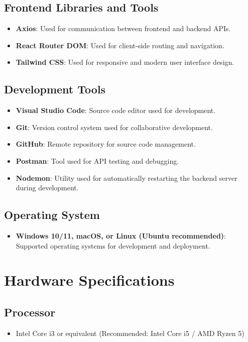 \documentclass[12pt,a4paper]{report}
\begin{document}
\subsection*{Frontend Libraries and Tools}
\begin{itemize}
	\item \textbf{Axios}: Used for communication between frontend and backend APIs.
	\item \textbf{React Router DOM}: Used for client-side routing and navigation.
	\item \textbf{Tailwind CSS}: Used for responsive and modern user interface design.
\end{itemize}

\subsection*{Development Tools}
\begin{itemize}
	\item \textbf{Visual Studio Code}: Source code editor used for development.
	\item \textbf{Git}: Version control system used for collaborative development.
	\item \textbf{GitHub}: Remote repository for source code management.
	\item \textbf{Postman}: Tool used for API testing and debugging.
	\item \textbf{Nodemon}: Utility used for automatically restarting the backend server during development.
\end{itemize}

\subsection*{Operating System}
\begin{itemize}
	\item \textbf{Windows 10/11, macOS, or Linux (Ubuntu recommended)}: Supported operating systems for development and deployment.
\end{itemize}

\section{Hardware Specifications}

\subsection*{Processor}
\begin{itemize}
	\item Intel Core i3 or equivalent (Recommended: Intel Core i5 / AMD Ryzen 5)
\end{itemize}
\end{document}
